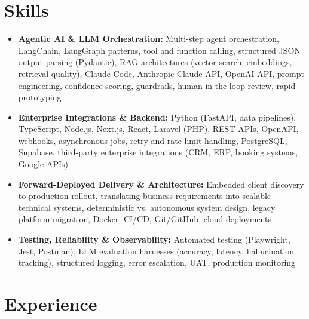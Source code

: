 \documentclass[a4paper,10pt]{article}
\begin{document}
\section{Skills}
\begin{itemize}
  \item \textbf{Agentic AI \& LLM Orchestration:} Multi-step agent orchestration, LangChain, LangGraph patterns, tool and function calling, structured JSON output parsing (Pydantic), RAG architectures (vector search, embeddings, retrieval quality), Claude Code, Anthropic Claude API, OpenAI API, prompt engineering, confidence scoring, guardrails, human-in-the-loop review, rapid prototyping
  \item \textbf{Enterprise Integrations \& Backend:} Python (FastAPI, data pipelines), TypeScript, Node.js, Next.js, React, Laravel (PHP), REST APIs, OpenAPI, webhooks, asynchronous jobs, retry and rate-limit handling, PostgreSQL, Supabase, third-party enterprise integrations (CRM, ERP, booking systems, Google APIs)
  \item \textbf{Forward-Deployed Delivery \& Architecture:} Embedded client discovery to production rollout, translating business requirements into scalable technical systems, deterministic vs. autonomous system design, legacy platform migration, Docker, CI/CD, Git/GitHub, cloud deployments
  \item \textbf{Testing, Reliability \& Observability:} Automated testing (Playwright, Jest, Postman), LLM evaluation harnesses (accuracy, latency, hallucination tracking), structured logging, error escalation, UAT, production monitoring
\end{itemize}

\section{Experience}
\end{document}
